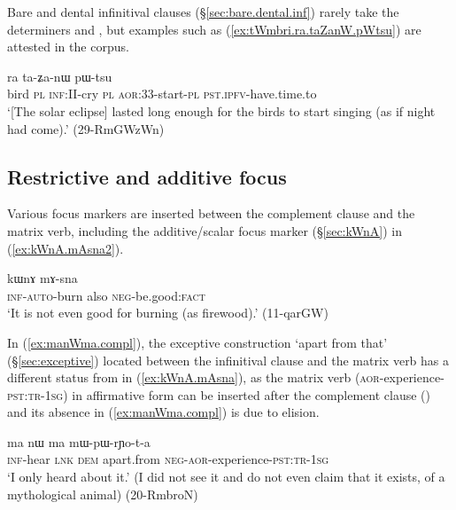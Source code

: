 Bare and dental infinitival clauses (§\ref{sec:bare.dental.inf}) rarely take the determiners  and , but examples such as (\ref{ex:tWmbri.ra.taZanW.pWtsu}) are attested in the corpus.

\begin{exe}
\ex \label{ex:tWmbri.ra.taZanW.pWtsu}
 ra ta-ʑa-nɯ pɯ-tsu \\
bird \textsc{pl} \textsc{inf}:II-cry \textsc{pl} \textsc{aor}:3\fl{}3-start-\textsc{pl} \textsc{pst}.\textsc{ipfv}-have.time.to \\
\glt `[The solar eclipse] lasted long enough for the birds to start singing (as if night had come).' (29-RmGWzWn)
\end{exe}
 
 
\subsection{Restrictive and additive focus} \label{sec:complement.restriction}
Various focus markers are inserted between the complement clause and the matrix verb, including the additive/scalar focus marker  (§\ref{sec:kWnA}) in (\ref{ex:kWnA.mAsna2}).

\begin{exe}
\ex \label{ex:kWnA.mAsna2}
\gll [kɤ-nɯ-βlɯ] kɯnɤ mɤ-sna \\
\textsc{inf}-\textsc{auto}-burn also \textsc{neg}-be.good:\textsc{fact} \\
\glt `It is not even good for burning (as firewood).' (11-qarGW)
\end{exe}

In (\ref{ex:manWma.compl}),  the exceptive construction  `apart from that' (§\ref{sec:exceptive})  located between the infinitival clause  and the matrix verb has a different status from  in (\ref{ex:kWnA.mAsna}), as the matrix verb  (\textsc{aor}-experience-\textsc{pst}:\textsc{tr}-\textsc{1sg}) in affirmative form can be inserted after the complement clause () and its absence in (\ref{ex:manWma.compl}) is due to elision.

\begin{exe}
\ex \label{ex:manWma.compl}
\gll  [kɤ-mtsʰɤm] ma nɯ ma mɯ-pɯ-rɲo-t-a \\
\textsc{inf}-hear \textsc{lnk} \textsc{dem} apart.from \textsc{neg}-\textsc{aor}-experience-\textsc{pst}:\textsc{tr}-\textsc{1sg} \\
\glt `I only heard about it.' (I did not see it and do not even claim that it exists, of a mythological animal) (20-RmbroN)
\end{exe}

